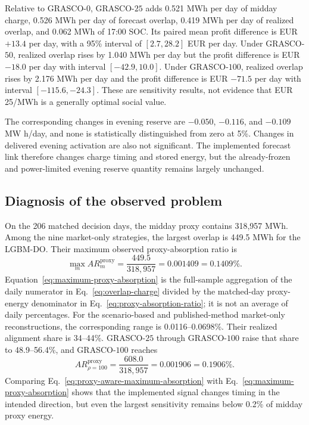 \documentclass[11pt,a4paper]{article}
\begin{document}
Relative to GRASCO-$0$, GRASCO-$25$ adds 0.521 MWh per day of midday charge,
0.526 MWh per day of forecast overlap, 0.419 MWh per day of realized overlap,
and 0.062 MWh of 17:00 SOC.  Its paired mean profit difference is EUR
$+13.4$ per day, with a 95\% interval of $[2.7,28.2]$ EUR per day.
Under GRASCO-$50$, realized overlap rises by 1.040 MWh per day but the profit
difference is EUR $-18.0$ per day with interval $[-42.9,10.0]$.  Under
GRASCO-$100$, realized overlap rises by 2.176 MWh per day and the profit
difference is EUR $-71.5$ per day with
interval $[-115.6,-24.3]$.  These are sensitivity results, not evidence that
EUR 25/MWh is a generally optimal social value.

The corresponding changes in evening reserve are $-0.050$, $-0.116$, and
$-0.109$ MW h/day, and none is statistically distinguished from zero at 5\%.
Changes in delivered evening activation are also not significant.  The
implemented forecast link therefore changes charge timing and stored energy,
but the already-frozen and power-limited evening reserve quantity remains
largely unchanged.

\subsection{Diagnosis of the observed problem}

On the 206 matched decision days, the midday proxy contains 318,957 MWh.  Among
the nine market-only strategies, the largest overlap is 449.5 MWh for the
LGBM-DO.
Their maximum observed proxy-absorption ratio is
\begin{equation}
  \max_m AR^{\mathrm{proxy}}_m
  =\frac{449.5}{318{,}957}=0.001409=0.1409\%.
  \label{eq:maximum-proxy-absorption}
\end{equation}
Equation~\eqref{eq:maximum-proxy-absorption} is the full-sample aggregation of
the daily numerator in Eq.~\eqref{eq:overlap-charge} divided by the matched-day
proxy-energy denominator in Eq.~\eqref{eq:proxy-absorption-ratio}; it is not an
average of daily percentages.
For the scenario-based and published-method market-only reconstructions, the
corresponding range is 0.0116--0.0698\%.  Their realized alignment share is
34--44\%.  GRASCO-$25$ through GRASCO-$100$ raise that share to 48.9--56.4\%,
and GRASCO-$100$ reaches
\begin{equation}
  AR^{\mathrm{proxy}}_{\rho=100}
  =\frac{608.0}{318{,}957}=0.001906=0.1906\%.
  \label{eq:proxy-aware-maximum-absorption}
\end{equation}
Comparing Eq.~\eqref{eq:proxy-aware-maximum-absorption} with
Eq.~\eqref{eq:maximum-proxy-absorption} shows that the implemented signal
changes timing in the intended direction, but even the largest sensitivity
remains below 0.2\% of midday proxy energy.
\end{document}
